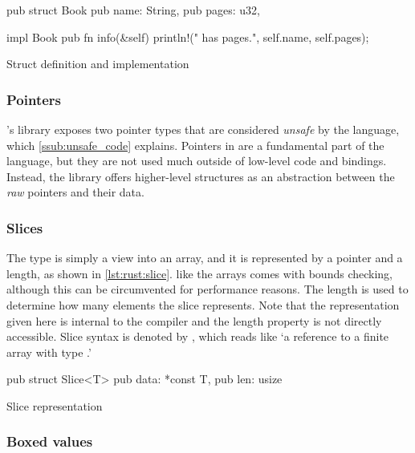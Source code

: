 \begin{listing}[H]
  \begin{rustcode}
pub struct Book {
  pub name: String,
  pub pages: u32,
}

impl Book {
  pub fn info(&self) {
    println!("{} has {} pages.", self.name, self.pages);
  }
}
  \end{rustcode}
  \caption{Struct definition and implementation}
  \label{lst:book_struct}
\end{listing}

\subsubsection{Pointers}

\rust's {\core} library exposes two pointer types that are considered \emph{unsafe} by the language, which \autoref{ssub:unsafe_code} explains.
Pointers in {\rust} are a fundamental part of the language, but they are not used much outside of low-level code and bindings.
Instead, the library offers higher-level structures as an abstraction between the \emph{raw} pointers and their data.

\subsubsection{Slices}

The  type is simply a view into an array, and it is represented by a pointer and a length, as shown in \autoref{lst:rust:slice}.
 like the arrays comes with bounds checking, although this can be circumvented for performance reasons.
The length is used to determine how many elements the slice represents.
Note that the representation given here is internal to the compiler and the length property is not directly accessible.
Slice syntax is denoted by \code{\&[T]}, which reads like `a reference to a finite array with type .'

\begin{listing}[H]
  \begin{rustcode}
pub struct Slice<T> {
  pub data: *const T,
  pub len: usize
}
\end{rustcode}
\caption{Slice representation}
\label{lst:rust:slice}
\end{listing}

\subsubsection{Boxed values}

